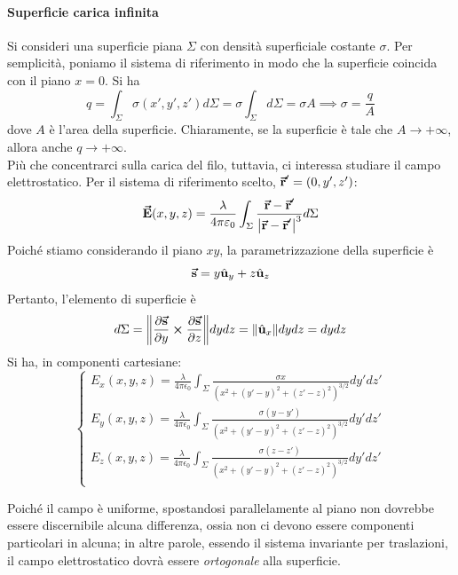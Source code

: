 \paragraph{Superficie carica infinita}
	Si consideri una superficie piana $\Sigma$ con densità superficiale costante $\sigma$. Per semplicità, poniamo il sistema di riferimento in modo che la superficie coincida con il piano $x=0$. Si ha
	\begin{equation*}
		q=\int_{\Sigma}\sigma(x',y',z')d\Sigma=\sigma\int_{\Sigma}d\Sigma=\sigma A\implies \sigma=\frac{q}{A}
	\end{equation*}
	dove $A$ è l'area della superficie. Chiaramente, se la superficie è tale che $A\to+\infty$, allora anche $q\to+\infty$.\\
	Più che concentrarci sulla carica del filo, tuttavia, ci interessa studiare il campo elettrostatico. Per il sistema di riferimento scelto, $\vb*{\va{r}}'=\left(0,y',z'\right)$:
	\begin{equation}
		\vb*{\va{E}}(x,y,z)=\frac{\lambda}{4\pi\varepsilon_0}\int_{\Sigma}\frac{\vb*{\va{r}}-\vb*{\va{r}}'}{\abs{\vb*{\va{r}}-\vb*{\va{r}}'}^3}d\Sigma
	\end{equation}
	Poiché stiamo considerando il piano $xy$, la parametrizzazione della superficie è
	\begin{equation}
		\vb*{\va{s}}=y\hat{\mathbf{u}}_y+z\hat{\mathbf{u}}_z
	\end{equation}
	Pertanto, l'elemento di superficie è
	\begin{equation*}
		d\Sigma=\norm{\pdv{\vb*{\va{s}}}{y}\cross\pdv{\vb*{\va{s}}}{z}}dydz=\norm{\hat{\mathbf{u}}_x}dydz=dydz
	\end{equation*}
	Si ha, in componenti cartesiane:
	\begin{equation*}
		\begin{cases}
			E_x(x,y,z)=\frac{\lambda}{4\pi\epsilon_0}\int_{\Sigma}\frac{\sigma x}{\left(x^2+(y'-y)^2+(z'-z)^2\right)^{3/2}}dy'dz'\\
			E_y(x,y,z)=\frac{\lambda}{4\pi\epsilon_0}\int_{\Sigma}\frac{\sigma (y-y')}{\left(x^2+(y'-y)^2+(z'-z)^2\right)^{3/2}}dy'dz'\\
			E_z(x,y,z)=\frac{\lambda}{4\pi\epsilon_0}\int_{\Sigma}\frac{\sigma (z-z')}{\left(x^2+(y'-y)^2+(z'-z)^2\right)^{3/2}}dy'dz'\\
		\end{cases}
	\end{equation*}
\begin{observe}
	Poiché il campo è uniforme, spostandosi parallelamente al piano non dovrebbe essere discernibile alcuna differenza, ossia non ci devono essere componenti particolari in alcuna; in altre parole, essendo il sistema invariante per traslazioni, il campo elettrostatico dovrà essere \textit{ortogonale} alla superficie.
\end{observe}
